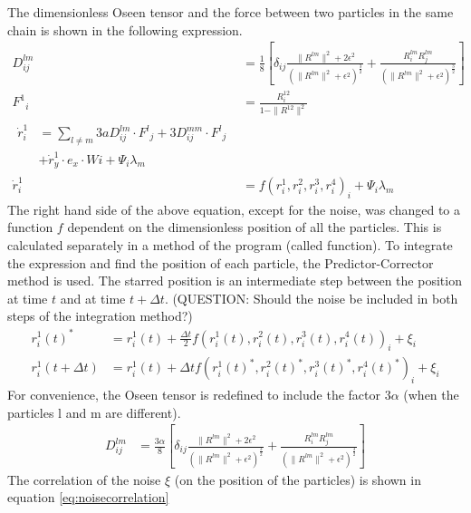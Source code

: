 \documentclass{article}
\begin{document}
The dimensionless Oseen tensor and the force between two particles in the same chain is shown in the following expression. 
\begin{align}
    {D_{ij}^{lm}} &= \frac{1}{8 }\left[ \delta_{ij} \frac{\|R^{lm}\|^2 + 2\epsilon^2}{(\|R^{lm}\|^2 + \epsilon ^2)^\frac{3}{2}} + \frac{R_i^{lm}R_j^{lm}}{(\|R^{lm}\|^2 + \epsilon ^2)^\frac{3}{2}} \right]\\
    {F^{1}}_{i}  &= \frac{{R}^{12}_{i}}{1 - \|{R^{12}}\|^2} \\
\begin{split}
    {\dot{r}}_{i}^{1} &=\sum_{l \neq m} 3 {a}{D_{ij}^{lm}} \cdot { F^{l}}_{j} +3{D_{ij}^{mm}} \cdot { F^{l}}_{j} \\&+
    {\dot{r}_{y}^{1}}\cdot e_{x} \cdot Wi + {\Psi_{i}} \lambda_m
\end{split}\\
    {\dot{r}}_{i}^{1} &= f({r^{1}_{i}},{r^{2}_{i}},{r^{3}_{i}},{r^{4}_{i}})_{i} +   {\Psi_{i}} \lambda_m
\end{align}
The right hand side of the above equation, except for the noise, was changed to a function $f$ dependent on the dimensionless position of all the particles. This is calculated separately in a method of the program (called function).
To integrate the expression and find the position of each particle, the Predictor-Corrector method is used. The starred position is an intermediate step between the position at time $t$ and at time $t +\Delta t$. (QUESTION: Should the noise be included in both steps of the integration method?)
\begin{align}
    {r}_{i}^{1}(t)^{*} &={r}_{i}^{1}(t)+ \frac{\Delta t}{2} f({r^{1}_{i}}(t),{r^{2}_{i}}(t),{r^{3}_{i}}(t),{r^{4}_{i}}(t))_{i} +   {\xi_{i}}  \\
    {r}_{i}^{1}(t+\Delta t) &= {r}_{i}^{1}(t)+\Delta t  f({r^{1}_{i}}(t)^{*},{r^{2}_{i}}(t)^{*},{r^{3}_{i}}(t)^{*},{r^{4}_{i}}(t)^{*})_{i} +   {\xi_{i}}  
\end{align}
For convenience, the Oseen tensor is redefined to include the factor $3 {\alpha}$ (when the particles l and m are different).
\begin{align}
    {D_{ij}^{lm}} &= \frac{3 {\alpha}}{8 }\left[ \delta_{ij} \frac{\|R^{lm}\|^2 + 2\epsilon^2}{(\|R^{lm}\|^2 + \epsilon ^2)^\frac{3}{2}} + \frac{R_i^{lm}R_j^{lm}}{(\|R^{lm}\|^2 + \epsilon ^2)^\frac{3}{2}} \right]
\end{align}
The correlation of the noise $\xi$ (on the position of the particles) is shown in equation \eqref{eq:noisecorrelation}
\end{document}
